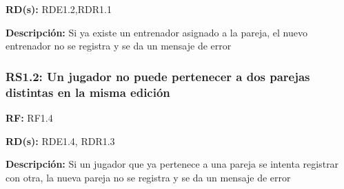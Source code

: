 \textbf{RD(s):} RDE1.2,RDR1.1

\textbf{Descripción:} Si ya existe un entrenador asignado a la pareja, el nuevo entrenador no se registra y se da un mensaje de error

\subsubsection{RS1.2: Un jugador no puede pertenecer a dos parejas distintas en la misma edición}
\textbf{RF:} RF1.4

\textbf{RD(s):} RDE1.4, RDR1.3

\textbf{Descripción:} Si un jugador que ya pertenece a una pareja se intenta registrar con otra, la nueva pareja no se registra y se da un mensaje de error
\pagebreak
